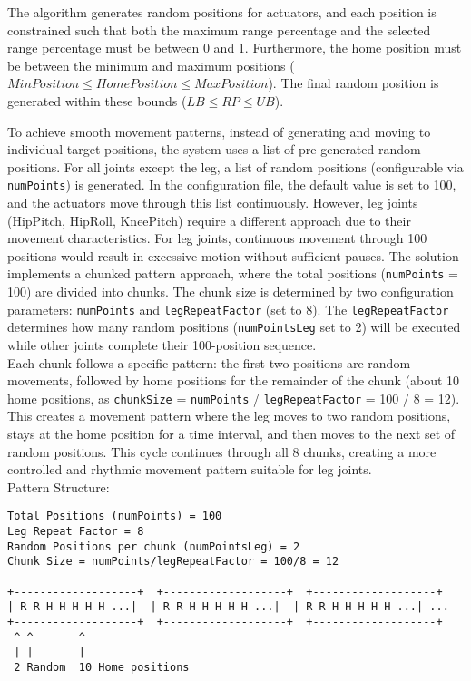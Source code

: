 \documentclass{CSSRforAfrica}
\begin{document}
\begin{tcolorbox}[colback=yellow!20,colframe=yellow!50!black,title=NOTE]
The algorithm generates random positions for actuators, and each position is constrained such that both the maximum range percentage and the selected range percentage must be between 0 and 1. Furthermore, the home position must be between the minimum and maximum positions ($MinPosition \leq HomePosition \leq MaxPosition$). The final random position is generated within these bounds ($LB \leq RP \leq UB$).
\end{tcolorbox}
\noindent To achieve smooth movement patterns, instead of generating and moving to individual target positions, the system uses a list of pre-generated random positions. For all joints except the leg, a list of random positions (configurable via \texttt{numPoints}) is generated. In the configuration file, the default value is set to 100, and the actuators move through this list continuously. However, leg joints (HipPitch, HipRoll, KneePitch) require a different approach due to their movement characteristics.
For leg joints, continuous movement through 100 positions would result in excessive motion without sufficient pauses. The solution implements a chunked pattern approach, where the total positions (\texttt{numPoints} = 100) are divided into chunks. The chunk size is determined by two configuration parameters: \texttt{numPoints} and \texttt{legRepeatFactor} (set to 8). The \texttt{legRepeatFactor} determines how many random positions (\texttt{numPointsLeg} set to 2) will be executed while other joints complete their 100-position sequence.\\[1em]
Each chunk follows a specific pattern: the first two positions are random movements, followed by home positions for the remainder of the chunk (about 10 home positions, as \texttt{chunkSize} = \texttt{numPoints} / \texttt{legRepeatFactor} = 100 / 8 = 12). This creates a movement pattern where the leg moves to two random positions, stays at the home position for a time interval, and then moves to the next set of random positions. This cycle continues through all 8 chunks, creating a more controlled and rhythmic movement pattern suitable for leg joints.\\[1em]
\newpage
\noindent Pattern Structure:
\begin{verbatim}
Total Positions (numPoints) = 100
Leg Repeat Factor = 8
Random Positions per chunk (numPointsLeg) = 2
Chunk Size = numPoints/legRepeatFactor = 100/8 = 12 

+-------------------+  +-------------------+  +-------------------+
| R R H H H H H ...|  | R R H H H H H ...|  | R R H H H H H ...| ...
+-------------------+  +-------------------+  +-------------------+
 ^ ^       ^
 | |       |
 2 Random  10 Home positions

\end{verbatim}
\end{document}
